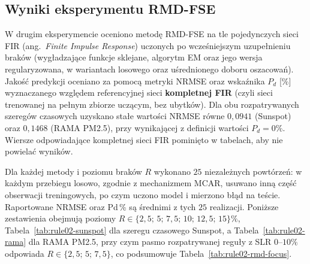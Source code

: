 \subsection{Wyniki eksperymentu RMD-FSE}
\label{subsec:WynikiRMDFSE}
W drugim eksperymencie oceniono metodę RMD-FSE na tle pojedynczych sieci FIR (ang.\ \textit{Finite Impulse Response}) uczonych po wcześniejszym uzupełnieniu braków (wygładzające funkcje sklejane, algorytm EM oraz jego wersja regularyzowana, w wariantach losowego oraz uśrednionego doboru oszacowań). Jakość predykcji oceniano za pomocą metryki NRMSE oraz wskaźnika $P_d$ [\%] wyznaczanego względem referencyjnej sieci \textbf{kompletnej FIR} (czyli sieci trenowanej na pełnym zbiorze uczącym, bez ubytków). Dla obu rozpatrywanych szeregów czasowych uzyskano stałe wartości NRMSE równe $0{,}0941$ (Sunspot) oraz $0{,}1468$ (RAMA PM2.5), przy wynikającej z definicji wartości $P_d = 0\%$. Wiersze odpowiadające kompletnej sieci FIR pominięto w tabelach, aby nie powielać wyników.


Dla każdej metody i poziomu braków $R$ wykonano $25$ niezależnych powtórzeń:
w każdym przebiegu losowo, zgodnie z mechanizmem MCAR, usuwano inną część obserwacji treningowych, po czym uczono model i mierzono błąd na teście. Raportowane NRMSE oraz Pd\,\%
są średnimi z tych $25$ realizacji. Poniższe zestawienia obejmują poziomy $R\in\{2{,}5;\,5;\,7{,}5;\,10;\,12{,}5;\,15\}\%$, Tabela~\ref{tab:rule02-sunspot} dla szeregu czasowego Sunspot, a Tabela~\ref{tab:rule02-rama} dla RAMA PM2.5, przy czym pasmo rozpatrywanej reguły z SLR $0$--$10\%$ odpowiada $R\in\{2{,}5;\,5;\,7{,}5\}$, co podsumowuje Tabela~\ref{tab:rule02-rmd-focus}.

